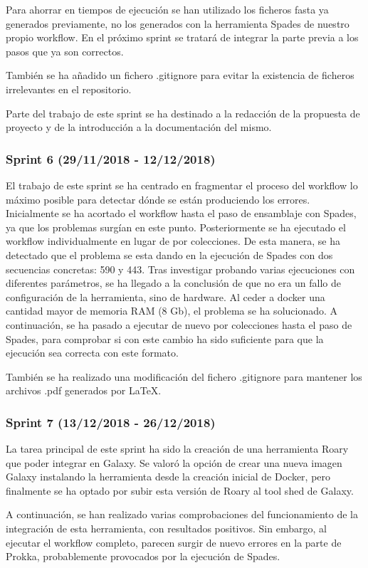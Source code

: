 Para ahorrar en tiempos de ejecución se han utilizado los ficheros fasta ya generados previamente, no los generados con la herramienta Spades de nuestro propio workflow. En el próximo sprint se tratará de integrar la parte previa a los pasos que ya son correctos.

También se ha añadido un fichero .gitignore para evitar la existencia de ficheros irrelevantes en el repositorio.

Parte del trabajo de este sprint se ha destinado a la redacción de la propuesta de proyecto y de la introducción a la documentación del mismo.

\subsubsection{Sprint 6 (29/11/2018 - 12/12/2018)}
El trabajo de este sprint se ha centrado en fragmentar el proceso del workflow lo máximo posible para detectar dónde se están produciendo los errores.
Inicialmente se ha acortado el workflow hasta el paso de ensamblaje con Spades, ya que los problemas surgían en este punto. Posteriormente se ha ejecutado el workflow individualmente en lugar de por colecciones. De esta manera, se ha detectado que el problema se esta dando en la ejecución de Spades con dos secuencias concretas: 590 y 443. Tras investigar probando varias ejecuciones con diferentes parámetros, se ha llegado a la conclusión de que no era un fallo de configuración de la herramienta, sino de hardware. Al ceder a docker una cantidad mayor de memoria RAM (8 Gb), el problema se ha solucionado. 
A continuación, se ha pasado a ejecutar de nuevo por colecciones hasta el paso de Spades, para comprobar si con este cambio ha sido suficiente para que la ejecución sea correcta con este formato. 

También se ha realizado una modificación del fichero .gitignore para mantener los archivos .pdf generados por LaTeX.

\subsubsection{Sprint 7 (13/12/2018 - 26/12/2018)}
La tarea principal de este sprint ha sido la creación de una herramienta Roary que poder integrar en Galaxy. Se valoró la opción de crear una nueva imagen Galaxy instalando la herramienta desde la creación inicial de Docker, pero finalmente se ha optado por subir esta versión de Roary al tool shed de Galaxy.

A continuación, se han realizado varias comprobaciones del funcionamiento de la integración de esta herramienta, con resultados positivos. Sin embargo, al ejecutar el workflow completo, parecen surgir de nuevo errores en la parte de Prokka, probablemente provocados por la ejecución de Spades.

\newpage \thispagestyle{empty} %